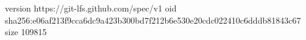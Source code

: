 version https://git-lfs.github.com/spec/v1
oid sha256:e06af213f9cca6dc9a423b300bd7f212b6e530e20cdc022410c6dddb81843c67
size 109815

